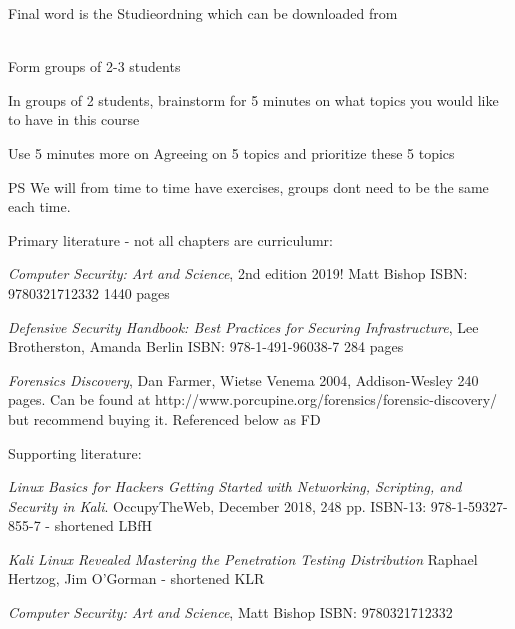 \documentclass[Screen16to9,17pt]{foils}
\begin{document}
Final word is the Studieordning which can be downloaded from\\
{\footnotesize {}\\
}



Form groups of 2-3 students

In groups of 2 students, brainstorm for 5 minutes on what topics you would like to have in this course

Use 5 minutes more on Agreeing on 5 topics and prioritize these 5 topics

\vskip 1cm
PS We will from time to time have exercises, groups dont need to be the same each time.


Primary literature - not all chapters are curriculumr:
\begin{list2}
\item \emph{Computer Security: Art and Science}, 2nd edition 2019! Matt Bishop ISBN: 9780321712332 1440 pages
\item \emph{Defensive Security Handbook: Best Practices for Securing Infrastructure}, Lee Brotherston, Amanda Berlin ISBN: 978-1-491-96038-7 284 pages
\item \emph{Forensics Discovery}, Dan Farmer, Wietse Venema 2004, Addison-Wesley 240 pages. Can be found at http://www.porcupine.org/forensics/forensic-discovery/ but recommend buying it. Referenced below as FD

\end{list2}
Supporting literature:
\begin{list2}
\item \emph{Linux Basics for Hackers Getting Started with Networking, Scripting, and Security in Kali}. OccupyTheWeb, December 2018, 248 pp. ISBN-13: 978-1-59327-855-7 - shortened LBfH
\item \emph{Kali Linux Revealed  Mastering the Penetration Testing Distribution}
Raphael Hertzog, Jim O'Gorman - shortened KLR
\end{list2}



\emph{Computer Security: Art and Science}, Matt Bishop ISBN: 9780321712332
\end{document}
